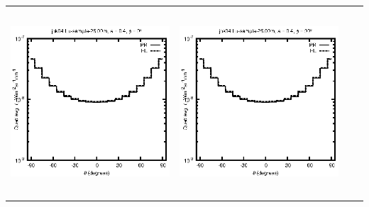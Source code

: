 \documentclass[10pt,a4paper]{article}
\begin{document}
\begin{adjustwidth}{-1.2in}{-1.2in}
\begin{tabular}{c c c c}
\includegraphics[height=7cm]{../eps/jok04_Lu_sample_25.00m_fwd.eps} &
\includegraphics[height=7cm]{../eps/jok04_Lu_sample_25.00m_cross.eps} \\
\end{tabular}

\pagebreak


\end{adjustwidth}
\end{document}
